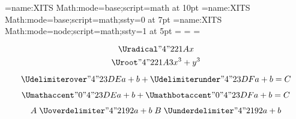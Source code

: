 

\font\4={name:XITS Math:mode=base;script=math} at 10pt
\font\5={name:XITS Math:mode=base;script=math;ssty=0} at 7pt
\font\6={name:XITS Math:mode=node;script=math;ssty=1} at 5pt
=\4 =\5 =\6

$$\Uradical "4 "221A {x}$$
$$\Uroot    "4 "221A {3}{x^3+y^3}$$

$$
  \Udelimiterover  "4 "23DE {a+b}
+ \Udelimiterunder "4 "23DF {a+b} = C
$$

$$
  \Umathaccent    "0 "4 "23DE {a+b}
+ \Umathbotaccent "0 "4 "23DF {a+b} = C
$$

$$
A \mathrel{\Uoverdelimiter  "4 "2192 {a+b}}
B \mathrel{\Uunderdelimiter "4 "2192 {a+b}}
$$

\bye

